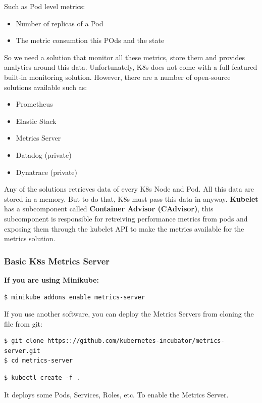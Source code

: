 \documentclass{article}
\newenvironment{codetemplate}[1][]{%
  \mybasecolorbox[#1]
  \itshape
}{%
  \endmybasecolorbox
}
\begin{document}
Such as Pod level metrics:
\begin{itemize}
    \item Number of replicas of a Pod
    \item The metric consumtion this POds and the state
\end{itemize}

So we need a solution that monitor all these metrics, store them and provides analytics around this data. Unfortunately, K8s does not come with a full-featured built-in monitoring solution. However, there are a number of open-source solutions available such as:
\begin{itemize}
    \item Prometheus
    \item Elastic Stack
    \item Metrics Server
    \item Datadog (private)
    \item Dynatrace (private)
\end{itemize}

Any of the solutions retrieves data of every K8s Node and Pod. All this data are stored in a memory. But to do that, K8s must pass this data in anyway. \textbf{Kubelet} has a subcomponent called \textbf{Container Advisor (CAdvisor)}, this subcomponent is responsible for retreiving performance metrics from pods and exposing them through the kubelet API to make the metrics available for the metrics solution.

\subsubsection{Basic K8s Metrics Server}

\textbf{If you are using Minikube:}
\begin{codetemplate}{}
\begin{verbatim}
$ minikube addons enable metrics-server
\end{verbatim}
\end{codetemplate}  

If you use another software, you can deploy the Metrics Servers from cloning the file from git:
\begin{codetemplate}{}
\begin{verbatim}
$ git clone https:://github.com/kubernetes-incubator/metrics-server.git
$ cd metrics-server
\end{verbatim}
\end{codetemplate} 
\begin{codetemplate}{}
\begin{verbatim}
$ kubectl create -f .
\end{verbatim}
\end{codetemplate} 
It deploys some Pods, Services, Roles, etc. To enable the Metrics Server.
\end{document}
